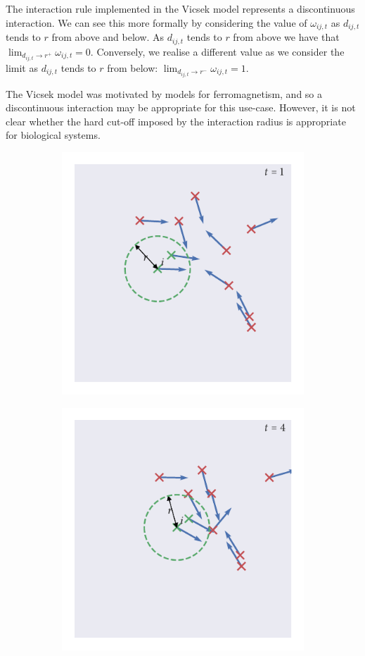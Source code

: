 The interaction rule implemented in the Vicsek model represents a discontinuous
interaction. We can see this more formally by considering the value of $\omega_{ij, t}$ as
$d_{ij,t}$ tends to $r$ from above and below. As $d_{ij,t}$ tends to $r$ from above we
have that $\lim_{d_{ij,t} \rightarrow r^+} \omega_{ij,t} = 0$. Conversely, we realise a
different value as we consider the limit as $d_{ij,t}$ tends to $r$ from below:
$\lim_{d_{ij,t} \rightarrow r^-} \omega_{ij,t} = 1$.

The Vicsek model was motivated by models for ferromagnetism, and so a discontinuous
interaction may be appropriate for this use-case. However, it is not clear whether the
hard cut-off imposed by the interaction radius is appropriate for biological systems.

\begin{figure}[tb]
    \begin{subfigure}[b]{0.5\textwidth}
        \includegraphics{vicsek_simulation_1.pdf}
    \end{subfigure}%
    \begin{subfigure}[b]{0.5\textwidth}
        \includegraphics{vicsek_simulation_4.pdf}

\end{subfigure}
\end{figure}
